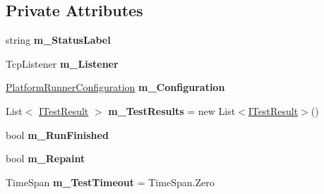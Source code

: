 \subsection*{Private Attributes}
\begin{DoxyCompactItemize}
\item 
\mbox{\label{class_unity_test_1_1_network_results_receiver_a0a4d8003ee2ae13497b901ec6686e440}} 
string {\bfseries m\+\_\+\+Status\+Label}
\item 
\mbox{\label{class_unity_test_1_1_network_results_receiver_a7128525677c8f20131193fa38dd6b8bc}} 
Tcp\+Listener {\bfseries m\+\_\+\+Listener}
\item 
\mbox{\label{class_unity_test_1_1_network_results_receiver_ac6cca5824b7141322febd8be4f7b99be}} 
\hyperlink{class_platform_runner_configuration}{Platform\+Runner\+Configuration} {\bfseries m\+\_\+\+Configuration}
\item 
\mbox{\label{class_unity_test_1_1_network_results_receiver_a4fda9533cbdf89f9df275dd0e66a4fcd}} 
List$<$ \hyperlink{interface_i_test_result}{I\+Test\+Result} $>$ {\bfseries m\+\_\+\+Test\+Results} = new List$<$\hyperlink{interface_i_test_result}{I\+Test\+Result}$>$()
\item 
\mbox{\label{class_unity_test_1_1_network_results_receiver_a9ed4cf8b7e78eb7be2ba77a52d8bd9c1}} 
bool {\bfseries m\+\_\+\+Run\+Finished}
\item 
\mbox{\label{class_unity_test_1_1_network_results_receiver_a5c8ba0b350c35ef70dd5dbc27c335703}} 
bool {\bfseries m\+\_\+\+Repaint}
\item 
\mbox{\label{class_unity_test_1_1_network_results_receiver_a5707397f0dea50219e4b7999f6ed05cd}} 
Time\+Span {\bfseries m\+\_\+\+Test\+Timeout} = Time\+Span.\+Zero
\item 
\mbox{\label{class_unity_test_1_1_network_results_receiver_af6f5b61526c3a583d3ea55f77775a8fe}} 

\end{DoxyCompactItemize}
